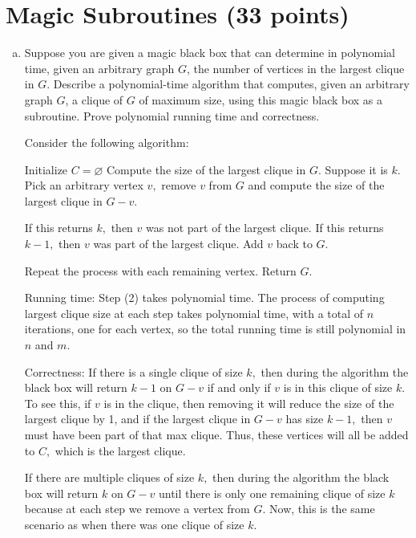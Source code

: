 \documentclass{article}
\begin{document}
\section{Magic Subroutines (33 points)}
\begin{enumerate}[(a)]
	\item Suppose you are given a magic black box that can determine in polynomial time, given an arbitrary graph $G$, the number of vertices in the largest clique in $G$. Describe a polynomial-time algorithm that computes, given an arbitrary graph $G$, a clique of $G$ of maximum size, using this magic black box as a subroutine.  Prove polynomial running time and correctness.  
		\begin{soln}
			Consider the following algorithm:
			\begin{enumerate}[(1)]
				\ii Initialize $C=\varnothing$
				\ii Compute the size of the largest clique in $G.$ Suppose it is $k.$
				\ii Pick an arbitrary vertex $v,$ remove $v$ from $G$ and compute the size of the largest clique in $G-v.$
				\begin{enumerate}[(a)]
					\ii If this returns $k,$ then $v$ was not part of the largest clique. 
					\ii If this returns $k-1,$ then $v$ was part of the largest clique. Add $v$ back to $G.$
				\end{enumerate}
				\ii Repeat the process with each remaining vertex.
				\ii Return $G.$
			\end{enumerate}

			Running time: Step (2) takes polynomial time. The process of computing largest clique size at each step takes polynomial time, with a total of $n$ iterations, one for each vertex, so the total running time is still polynomial in $n$ and $m.$

			Correctness:  If there is a single clique of size $k,$ then during the algorithm the black box will return $k-1$ on $G-v$ if and only if $v$ is in this clique of size $k.$ To see this, if $v$ is in the clique, then removing it will reduce the size of the largest clique by 1, and if the largest clique in $G-v$ has size $k-1,$ then $v$ must have been part of that max clique. Thus, these vertices will all be added to $C,$ which is the largest clique.

			If there are multiple cliques of size $k,$ then during the algorithm the black box will return $k$ on $G-v$ until there is only one remaining clique of size $k$ because at each step we remove a vertex from $G.$ Now, this is the same scenario as when there was one clique of size $k.$
		\end{soln}


\end{enumerate}
\end{document}
